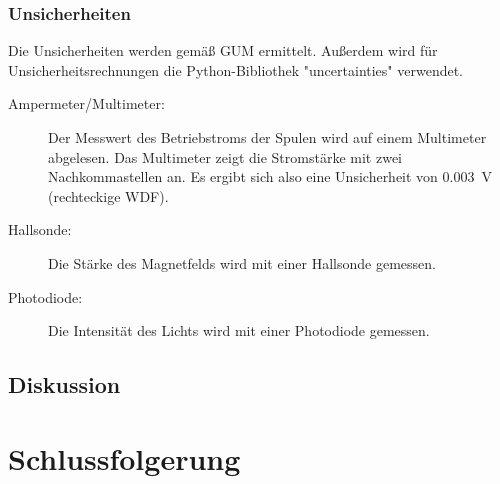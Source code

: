 \documentclass[
	a4paper,
	12pt,
	pagesize,
	ngerman
]{scrartcl}
\begin{document}
	\subsubsection{Unsicherheiten} %
	Die Unsicherheiten werden gemäß GUM ermittelt. 
	Außerdem wird für Unsicherheitsrechnungen die Python-Bibliothek "uncertainties" verwendet.
	\begin{description}
		\item[Ampermeter/Multimeter:] Der Messwert des Betriebstroms der Spulen wird auf einem Multimeter abgelesen. 
			Das Multimeter zeigt die Stromstärke mit zwei Nachkommastellen an. 
			Es ergibt sich also eine Unsicherheit von \SI{0,003}{V} (rechteckige WDF).
		\item[Hallsonde:]  Die Stärke des Magnetfelds wird mit einer Hallsonde gemessen. 
		\item[Photodiode:]  Die Intensität des Lichts wird mit einer Photodiode gemessen. 
	\end{description} 


	
	\subsection{Diskussion}
	
	\section{Schlussfolgerung}
	
\end{document}

